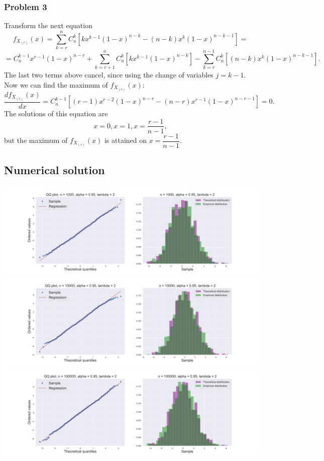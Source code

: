 \documentclass[a4paper, 12pt]{article}
\begin{document}
\subsubsection{Problem 3}
Transform the next equation 
$$
f_{X_{(r)}}(x) = \sum \limits_{k = r}^n C_n^k [k x^{k-1} (1 - x )^{n - k} - (n - k) x^k (1 - x)^{n - k - 1}] = 
$$
$$
= C_n^{k-1} x^{r-1} (1 - x)^{n-r} + \sum \limits_{k = r+1}^n C_n^k [k x^{k-1} (1 - x )^{n - k}] - \sum \limits_{k = r}^{n-1} C_n^k [(n - k) x^k (1 - x)^{n - k - 1}].
$$
The last two terms above cancel, since using the change of variables $j = k - 1.$
Now we can find the maximum of $f_{X_{(r)}}(x):$
$$
\dfrac{d f_{X_{(r)}}(x)}{d x} = C_n^{k-1} [(r-1)x^{r-2} (1 - x)^{n-r} - (n - r)x^{r-1}(1-x)^{n-r-1}] = 0.
$$
The solutions of this equation are
$$
x = 0, x = 1, x = \dfrac{r-1}{n-1},
$$
but the maximum of $f_{X_{(r)}}(x)$ is attained on $x = \dfrac{r-1}{n-1}.$
\subsection{Numerical solution}
\includegraphics[width=\textwidth]{"Images/Task2_1000.png"}
\includegraphics[width=\textwidth]{"Images/Task2_10000.png"}
\includegraphics[width=\textwidth]{"Images/Task2_100000.png"}
\end{document}
